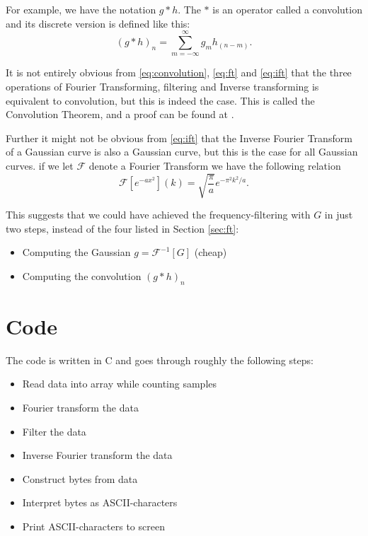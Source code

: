 \documentclass[12pt,a4paper]{article}
\begin{document}
For example, we have the notation $g*h$.
The $*$ is an operator called a convolution and its
discrete version is defined like this:
\begin{equation}\label{eq:convolution}
  (g*h)_n = \sum_{m=-\infty}^{\infty} g_m h_{(n-m)}.
\end{equation}

It is not entirely obvious from \eqref{eq:convolution}, \eqref{eq:ft} and \eqref{eq:ift} that
the three operations of Fourier Transforming, filtering and Inverse transforming is equivalent
to convolution, but this is indeed the case. This is called the Convolution Theorem, and
a proof can be found at \cite{convolution_theorem}.

Further it might not be obvious from \eqref{eq:ift} that the Inverse Fourier Transform of a
Gaussian curve is also a Gaussian curve, but this is the case for all Gaussian curves.
if we let $\mathcal{F}$ denote  a Fourier Transform we have the following relation
\[
  \mathcal{F}\left[e^{-ax^2} \right](k) = \sqrt{\frac{\pi}{a}} e^{-\pi^2k^2/a}.
\]

This suggests that we could have achieved the frequency-filtering with $G$ in just two steps,
instead of the four listed in Section \ref{sec:ft}:
\begin{itemize}
  \item Computing the Gaussian $g=\mathcal{F}^{-1}[G]$ (cheap)
  \item Computing the convolution $(g*h)_n$
\end{itemize}

\section{Code}\label{sec:code}
The code is written in C and goes through roughly the following steps:
\begin{itemize}
  \item Read data into array while counting samples
  \item Fourier transform the data
  \item Filter the data
  \item Inverse Fourier transform the data
  \item Construct bytes from data
  \item Interpret bytes as ASCII-characters
  \item Print ASCII-characters to screen
\end{itemize}
\end{document}

